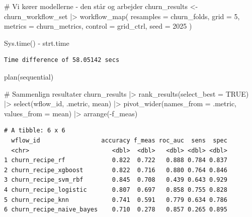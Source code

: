 \documentclass[
  11pt,
  letterpaper,
  DIV=11,
  numbers=noendperiod]{scrartcl}
\newenvironment{Shaded}{\begin{snugshade}}{\end{snugshade}}
\newcommand{\AttributeTok}[1]{\textcolor[rgb]{0.40,0.45,0.13}{#1}}
\newcommand{\CommentTok}[1]{\textcolor[rgb]{0.37,0.37,0.37}{#1}}
\newcommand{\ConstantTok}[1]{\textcolor[rgb]{0.56,0.35,0.01}{#1}}
\newcommand{\DecValTok}[1]{\textcolor[rgb]{0.68,0.00,0.00}{#1}}
\newcommand{\FunctionTok}[1]{\textcolor[rgb]{0.28,0.35,0.67}{#1}}
\newcommand{\NormalTok}[1]{\textcolor[rgb]{0.00,0.23,0.31}{#1}}
\newcommand{\OtherTok}[1]{\textcolor[rgb]{0.00,0.23,0.31}{#1}}
\newcommand{\SpecialCharTok}[1]{\textcolor[rgb]{0.37,0.37,0.37}{#1}}
\begin{document}
\begin{Shaded}
\begin{Highlighting}[]
\CommentTok{\# Vi kører modellerne {-} den står og arbejder}
\NormalTok{churn\_results }\OtherTok{\textless{}{-}}\NormalTok{ churn\_workflow\_set }\SpecialCharTok{|\textgreater{}} 
  \FunctionTok{workflow\_map}\NormalTok{(}
    \AttributeTok{resamples =}\NormalTok{ churn\_folds, }
    \AttributeTok{grid =} \DecValTok{5}\NormalTok{,}
    \AttributeTok{metrics =}\NormalTok{ churn\_metrics,}
    \AttributeTok{control =}\NormalTok{ grid\_ctrl,}
    \AttributeTok{seed =} \DecValTok{2025}
\NormalTok{  )}
\end{Highlighting}
\end{Shaded}

\begin{Shaded}
\begin{Highlighting}[]
\FunctionTok{Sys.time}\NormalTok{() }\SpecialCharTok{{-}}\NormalTok{ strt.time}
\end{Highlighting}
\end{Shaded}

\begin{verbatim}
Time difference of 58.05142 secs
\end{verbatim}

\begin{Shaded}
\begin{Highlighting}[]
\FunctionTok{plan}\NormalTok{(sequential)}

\CommentTok{\# Sammenlign resultater}
\NormalTok{churn\_results }\SpecialCharTok{|\textgreater{}} 
  \FunctionTok{rank\_results}\NormalTok{(}\AttributeTok{select\_best =} \ConstantTok{TRUE}\NormalTok{) }\SpecialCharTok{|\textgreater{}} 
  \FunctionTok{select}\NormalTok{(wflow\_id, .metric, mean) }\SpecialCharTok{|\textgreater{}} 
  \FunctionTok{pivot\_wider}\NormalTok{(}\AttributeTok{names\_from =}\NormalTok{ .metric, }\AttributeTok{values\_from =}\NormalTok{ mean) }\SpecialCharTok{|\textgreater{}} 
  \FunctionTok{arrange}\NormalTok{(}\SpecialCharTok{{-}}\NormalTok{f\_meas)}
\end{Highlighting}
\end{Shaded}

\begin{verbatim}
# A tibble: 6 x 6
  wflow_id                 accuracy f_meas roc_auc  sens  spec
  <chr>                       <dbl>  <dbl>   <dbl> <dbl> <dbl>
1 churn_recipe_rf             0.822  0.722   0.888 0.784 0.837
2 churn_recipe_xgboost        0.822  0.716   0.880 0.764 0.846
3 churn_recipe_svm_rbf        0.845  0.708   0.439 0.643 0.929
4 churn_recipe_logistic       0.807  0.697   0.858 0.755 0.828
5 churn_recipe_knn            0.741  0.591   0.779 0.634 0.786
6 churn_recipe_naive_bayes    0.710  0.278   0.857 0.265 0.895
\end{verbatim}
\end{document}
